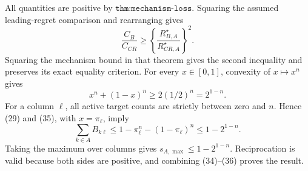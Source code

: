 All quantities are positive by \(\texttt{thm:mechanism-loss}\).  Squaring the assumed leading-regret comparison and rearranging gives
\[
\frac{C_B}{C_{CR}}
\geq\left\{\frac{R_{B,A}^\star}{R_{CR,A}^\star}\right\}^{2}. \tag{34}
\]
Squaring the mechanism bound in that theorem gives the second inequality and preserves its exact equality criterion.  For every \(x\in[0,1]\), convexity of \(x\mapsto x^n\) gives
\[
x^n+(1-x)^n\geq2(1/2)^n=2^{1-n}. \tag{35}
\]
For a column \(\ell\), all active target counts are strictly between zero and \(n\).  Hence (29) and (35), with \(x=\pi_\ell\), imply
\[
\sum_{k\in A}B_{k\ell}
\leq1-\pi_\ell^n-(1-\pi_\ell)^n
\leq1-2^{1-n}. \tag{36}
\]
Taking the maximum over columns gives \(s_{A,\max}\leq1-2^{1-n}\).  Reciprocation is valid because both sides are positive, and combining (34)--(36) proves the result.